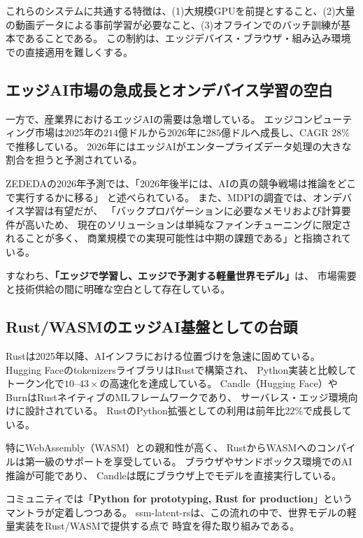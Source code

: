 \documentclass[11pt,a4paper]{ltjsarticle}
\begin{document}
これらのシステムに共通する特徴は、(1)大規模GPUを前提とすること、(2)大量の動画データによる事前学習が必要なこと、(3)オフラインでのバッチ訓練が基本であることである。
この制約は、エッジデバイス・ブラウザ・組み込み環境での直接適用を難しくする。

\subsection{エッジAI市場の急成長とオンデバイス学習の空白}

一方で、産業界におけるエッジAIの需要は急増している。
エッジコンピューティング市場は2025年の$214$億ドルから2026年に$285$億ドルへ成長し、CAGR $28\%$で推移している\cite{edgecomputing2026market}。
2026年にはエッジAIがエンタープライズデータ処理の大きな割合を担うと予測されている\cite{resolvetech2026edgeai}。

ZEDEDAの2026年予測では、「2026年後半には、AIの真の競争戦場は推論をどこで実行するかに移る」
と述べられている\cite{zededa2026edge}。
また、MDPIの調査では、オンデバイス学習は有望だが、
「バックプロパゲーションに必要なメモリおよび計算要件が高いため、
現在のソリューションは単純なファインチューニングに限定されることが多く、
商業規模での実現可能性は中期の課題である」と指摘されている\cite{mdpi2025edgeaipractice}。

すなわち、\textbf{「エッジで学習し、エッジで予測する軽量世界モデル」}は、
市場需要と技術供給の間に明確な空白として存在している。

\subsection{Rust/WASMのエッジAI基盤としての台頭}

Rustは2025年以降、AIインフラにおける位置づけを急速に固めている。
Hugging FaceのtokenizersライブラリはRustで構築され、
Python実装と比較してトークン化で$10$--$43\times$の高速化を達成している\cite{groundy2026rustpython}。
Candle（Hugging Face）やBurnはRustネイティブのMLフレームワークであり、
サーバレス・エッジ環境向けに設計されている。
RustのPython拡張としての利用は前年比$22\%$で成長している\cite{rusttrends2025}。

特にWebAssembly（WASM）との親和性が高く、
RustからWASMへのコンパイルは第一級のサポートを享受している。
ブラウザやサンドボックス環境でのAI推論が可能であり、
Candleは既にブラウザ上でモデルを直接実行している\cite{rusttrends2025}。

コミュニティでは「\textbf{Python for prototyping, Rust for production}」というマントラが定着しつつある\cite{visiononedge2025rust}。
ssm-latent-rsは、この流れの中で、世界モデルの軽量実装をRust/WASMで提供する点で
時宜を得た取り組みである。
\end{document}
